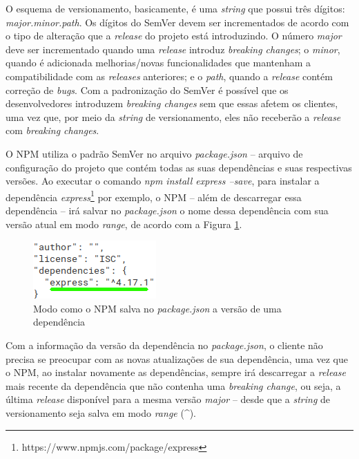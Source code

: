 O esquema de versionamento, basicamente, é uma \textit{string} que possui três dígitos: \textit{major.minor.path}. Os dígitos do \gls{SemVer} devem ser incrementados de acordo com o tipo de alteração que a \textit{release} do projeto está introduzindo. O número \textit{major} deve ser incrementado quando uma \textit{release} introduz \textit{breaking changes}; o \textit{minor}, quando é adicionada melhorias/novas funcionalidades que mantenham a compatibilidade com as \textit{releases} anteriores; e o \textit{path}, quando a \textit{release} contém correção de \textit{bugs}. Com a padronização do \gls{SemVer} é possível que os desenvolvedores introduzem \textit{breaking changes} sem que essas afetem os clientes, uma vez que, por meio da \textit{string} de versionamento, eles não receberão a \textit{release} com \textit{breaking changes}.

O \gls{NPM} utiliza o padrão \gls{SemVer} no arquivo \textit{package.json} -- arquivo de configuração do projeto que contém todas as suas dependências e suas respectivas versões. Ao executar o comando \textit{npm install express --save}, para instalar a dependência \textit{express}\footnote{https://www.npmjs.com/package/express} por exemplo, o \gls{NPM} -- além de descarregar essa dependência -- irá salvar no \textit{package.json} o nome dessa dependência com sua versão atual em modo \textit{range}, de acordo com a Figura \ref{fig:dep_express}.

\begin{figure}
    \centering
    \includegraphics{figuras/dependencies_express.png}
    \caption{Modo como o \gls{NPM} salva no \textit{package.json} a versão de uma dependência}
    \label{fig:dep_express}
\end{figure}{}

Com a informação da versão da dependência no \textit{package.json}, o cliente não precisa se preocupar com as novas atualizações de sua dependência, uma vez que o \gls{NPM}, ao instalar novamente as dependências, sempre irá descarregar a \textit{release} mais recente da dependência que não contenha uma \textit{breaking change}, ou seja, a última \textit{release} disponível para a mesma versão \textit{major} -- desde que a \textit{string} de versionamento seja salva em modo \textit{range} (\textasciicircum).

